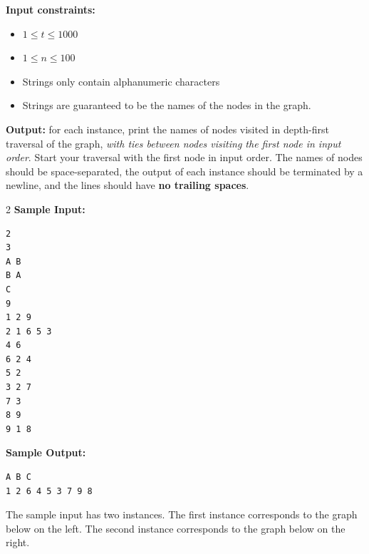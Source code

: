 \documentclass[solutionorbox, answers]{exam}
\begin{document}
\begin{questions}
\textbf{Input constraints:}
\begin{itemize}
    \item $1 \leq t \leq 1000$
    \item $1 \leq n \leq 100$
    \item Strings only contain alphanumeric characters
    \item Strings are guaranteed to be the names of the nodes in the graph.
\end{itemize}

\textbf{Output:} for each instance, print the names of nodes visited in depth-first traversal of the graph, \emph{with ties between nodes visiting the first node in input order}. Start your traversal with the first node in input order. The names of nodes should be space-separated, the output of each instance
should be terminated by a newline, and the lines should have \textbf{no trailing spaces}.

\begin{multicols}{2}
\textbf{Sample Input:} 
\begin{verbatim}
2
3
A B
B A
C
9
1 2 9
2 1 6 5 3
4 6
6 2 4
5 2
3 2 7
7 3
8 9
9 1 8
\end{verbatim}
\columnbreak
\textbf{Sample Output:} 
\begin{verbatim}
A B C
1 2 6 4 5 3 7 9 8
\end{verbatim}
\end{multicols}

The sample input has two instances. 
The first instance corresponds to the graph below on the left. 
The second instance corresponds to the graph below on the right.
\begin{center}
\begin{minipage}{0.3\linewidth}
\end{minipage}
\qquad\qquad
\begin{minipage}{0.3\linewidth}
\end{minipage}
\end{center}


\end{questions}
\end{document}
